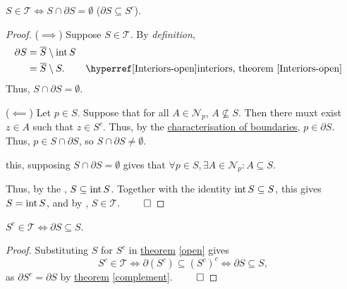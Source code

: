 \documentclass{atomic}
\begin{document}
    \begin{theorem} \label{open}
        $S \in \mathcal{T} \iff S \cap \partial S = \emptyset$ ($\partial S \subseteq S^c$).
    \end{theorem}
    \begin{proof}
        ($\implies$)
        Suppose $S \in \mathcal{T}$. By \textit{definition},
        \begin{align*}
            \partial S &= \overline{S} \setminus \inte S \\
            &= \overline{S} \setminus S. && \text{\ex[open]{Interiors}{interiors, theorem} \exref[open]{Interiors}}
        \end{align*}
        Thus, $S \cap \partial S = \emptyset$.

        ($\impliedby$)
        Let $p \in S$. Suppose that for all $A \in \mathcal{N}_p$, $A \not\subseteq S$.
        Then there muxt exist $z \in A$ such that $z \in S^c$.
        Thus, by the \hyperref[characterisation]{characterisation of boundaries}, $p \in \partial S$.
        Thus, $p \in S \cap \partial S$, so $S \cap \partial S \ne \emptyset$.

         this, supposing $S \cap \partial S = \emptyset$ gives that $\forall p \in S, \exists A \in \mathcal{N}_p : A \subseteq S$.

        Thus, by the , $S \subseteq \operatorname{int} S$.
        Together with the identity $\operatorname{int} S \subseteq S$, this gives $S = \operatorname{int} S$, and by   , $S \in \mathcal{T}$. $\qed$
    \end{proof}

    \begin{theorem} \label{closed}
        $S^c \in \mathcal{T} \iff \partial S \subseteq S$.
    \end{theorem}
    \begin{proof}
        Substituting $S$ for $S^c$ in \hyperref[open]{theorem} \ref{open} gives
        $$ S^c \in \mathcal{T} \iff \partial (S^c) \subseteq (S^c)^c \iff \partial S \subseteq S, $$
        as $\partial S^c = \partial S$ by \hyperref[complement]{theorem} \ref{complement}. $\qed$
    \end{proof}
\end{document}
